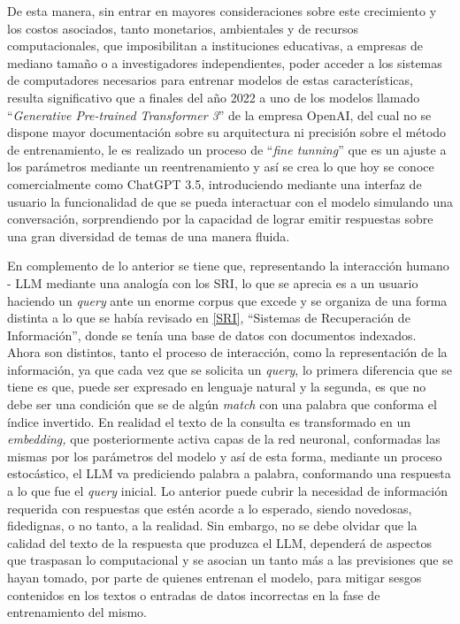 \documentclass[
  12pt,
  openany]{book}
\begin{document}
De esta manera, sin entrar en mayores consideraciones sobre este crecimiento y los costos asociados, tanto monetarios, ambientales y de recursos computacionales, que imposibilitan a instituciones educativas, a empresas de mediano tamaño o a investigadores independientes, poder acceder a los sistemas de computadores necesarios para entrenar modelos de estas características, resulta significativo que a finales del año 2022 a uno de los modelos llamado ``\emph{Generative Pre-trained Transformer 3}'' de la empresa OpenAI, del cual no se dispone mayor documentación sobre su arquitectura ni precisión sobre el método de entrenamiento, le es realizado un proceso de ``\emph{fine tunning}'' que es un ajuste a los parámetros mediante un reentrenamiento y así se crea lo que hoy se conoce comercialmente como ChatGPT 3.5, introduciendo mediante una interfaz de usuario la funcionalidad de que se pueda interactuar con el modelo simulando una conversación, sorprendiendo por la capacidad de lograr emitir respuestas sobre una gran diversidad de temas de una manera fluida.

En complemento de lo anterior se tiene que, representando la interacción humano - LLM mediante una analogía con los SRI, lo que se aprecia es a un usuario haciendo un \emph{query} ante un enorme corpus que excede y se organiza de una forma distinta a lo que se había revisado en \ref{SRI}, ``Sistemas de Recuperación de Información'', donde se tenía una base de datos con documentos indexados. Ahora son distintos, tanto el proceso de interacción, como la representación de la información, ya que cada vez que se solicita un \emph{query}, lo primera diferencia que se tiene es que, puede ser expresado en lenguaje natural y la segunda, es que no debe ser una condición que se de algún \emph{match} con una palabra que conforma el índice invertido. En realidad el texto de la consulta es transformado en un \emph{embedding,} que posteriormente activa capas de la red neuronal, conformadas las mismas por los parámetros del modelo y así de esta forma, mediante un proceso estocástico, el LLM va prediciendo palabra a palabra, conformando una respuesta a lo que fue el \emph{query} inicial. Lo anterior puede cubrir la necesidad de información requerida con respuestas que estén acorde a lo esperado, siendo novedosas, fidedignas, o no tanto, a la realidad. Sin embargo, no se debe olvidar que la calidad del texto de la respuesta que produzca el LLM, dependerá de aspectos que traspasan lo computacional y se asocian un tanto más a las previsiones que se hayan tomado, por parte de quienes entrenan el modelo, para mitigar sesgos contenidos en los textos o entradas de datos incorrectas en la fase de entrenamiento del mismo.
\end{document}
